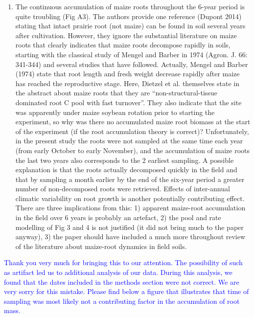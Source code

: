 \documentclass[]{article}
\providecommand{\tightlist}{%
  \setlength{\itemsep}{0pt}\setlength{\parskip}{0pt}}
\begin{document}
\begin{enumerate}
\def\labelenumi{\arabic{enumi})}
\tightlist
\item
  The continuous accumulation of maize roots throughout the 6-year
  period is quite troubling (Fig A3). The authors provide one reference
  (Dupont 2014) stating that intact prairie root (not maize) can be
  found in soil several years after cultivation. However, they ignore
  the substantial literature on maize roots that clearly indicates that
  maize roots decompose rapidly in soils, starting with the classical
  study of Mengel and Barber in 1974 (Agron. J. 66: 341-344) and several
  studies that have followed. Actually, Mengel and Barber (1974) state
  that root length and fresh weight decrease rapidly after maize has
  reached the reproductive stage. Here, Dietzel et al. themselves state
  in the abstract about maize roots that they are
  ``non-structural-tissue dominated root C pool with fast turnover''.
  They also indicate that the site was apparently under maize soybean
  rotation prior to starting the experiment, so why was there no
  accumulated maize root biomass at the start of the experiment (if the
  root accumulation theory is correct)? Unfortunately, in the present
  study the roots were not sampled at the same time each year (from
  early October to early November), and the accumulation of maize roots
  the last two years also corresponds to the 2 earliest sampling. A
  possible explanation is that the roots actually decomposed quickly in
  the field and that by sampling a month earlier by the end of the
  six-year period a greater number of non-decomposed roots were
  retrieved. Effects of inter-annual climatic variability on root growth
  is another potentially contributing effect. There are three
  implications from this: 1) apparent maize-root accumulation in the
  field over 6 years is probably an artefact, 2) the pool and rate
  modelling of Fig 3 and 4 is not justified (it did not bring much to
  the paper anyway), 3) the paper should have included a much more
  throughout review of the literature about maize-root dynamics in field
  soils.
\end{enumerate}

\textcolor{blue}{Thank you very much for bringing this to our attention. The possibility of such as artifact led us to additional analysis of our data. During this analysis, we found that the dates included in the methods section were not correct. We are very sorry for this mistake. Please find below a figure that illustrates that time of sampling was most likely not a contributing factor in the accumulation of root mass.}
\end{document}

